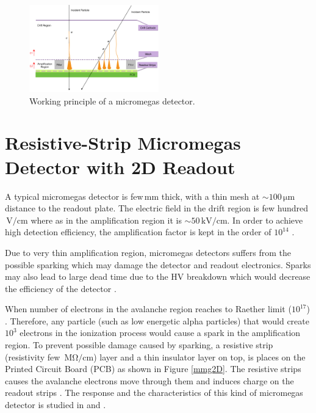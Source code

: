 \documentclass[a4paper,11pt]{article}
\newcommand{\myunit}[1]{$\, \mathrm{#1}$}
\begin{document}
\begin{figure}[h!]
	\centering
    \includegraphics[keepaspectratio=true, width=0.5\textwidth]{Figures/MMG-drawing.png}
	\caption{Working principle of a micromegas detector.}
	\label{micromegas}
\end{figure}




\section{Resistive-Strip Micromegas Detector with 2D Readout}
\label{Sec:MMG}

A typical micromegas detector is few\myunit{mm} thick, with a thin mesh at $\sim 100$\myunit{\mu m} distance to the readout plate. The electric field in the drift region is few hundred\myunit{V/cm} where as in the amplification region it is $\sim 50$\myunit{kV/cm}. In order to achieve high detection efficiency, the amplification factor is kept in the order of $10^{14}$ \cite{Alexopoulos:2011zz}. 

Due to very thin amplification region, micromegas detectors suffers from the possible sparking which may damage the detector and readout electronics. Sparks may also lead to large dead time due to the HV breakdown which would decrease the efficiency of the detector  \cite{Alexopoulos:2011zz}. 

When number of electrons in the avalanche region reaches to Raether limit ($10^{17}$) \cite{Raether1939}. Therefore, any particle (such as low energetic alpha particles) that would create $10^{3}$ electrons in the ionization process would cause a spark in the amplification region. To prevent possible damage caused by sparking, a resistive strip (resistivity few \myunit{M \Omega /cm}) layer and a thin insulator layer on top, is places on the Printed Circuit Board (PCB) as shown in Figure \ref{mmg2D}. The resistive strips causes the avalanche electrons move through them and induces charge on the readout strips \cite{Alexopoulos:2011zz}. The response and the characteristics of this kind of micromegas detector is studied in  \cite{Byszewski:2012zz} and \cite{Lin2014281}.
\end{document}
